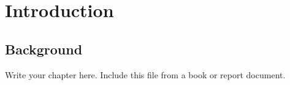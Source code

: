 \chapter{Introduction}
\section{Background}
Write your chapter here. Include this file from a book or report document.
